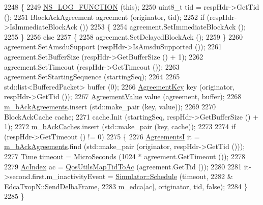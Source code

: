 \begin{DoxyCode}
2248 \{
2249   \hyperlink{log-macros-disabled_8h_a90b90d5bad1f39cb1b64923ea94c0761}{NS\_LOG\_FUNCTION} (\textcolor{keyword}{this});
2250   uint8\_t tid = respHdr->GetTid ();
2251   BlockAckAgreement agreement (originator, tid);
2252   \textcolor{keywordflow}{if} (respHdr->IsImmediateBlockAck ())
2253     \{
2254       agreement.SetImmediateBlockAck ();
2255     \}
2256   \textcolor{keywordflow}{else}
2257     \{
2258       agreement.SetDelayedBlockAck ();
2259     \}
2260   agreement.SetAmsduSupport (respHdr->IsAmsduSupported ());
2261   agreement.SetBufferSize (respHdr->GetBufferSize () + 1);
2262   agreement.SetTimeout (respHdr->GetTimeout ());
2263   agreement.SetStartingSequence (startingSeq);
2264 
2265   std::list<BufferedPacket> buffer (0);
2266   \hyperlink{classns3_1_1MacLow_a8d666357756bbc5ea2d1b7fac3a5e938}{AgreementKey} key (originator, respHdr->GetTid ());
2267   \hyperlink{classns3_1_1MacLow_a68fcd01fab733ead22d9655640258a6a}{AgreementValue} value (agreement, buffer);
2268   \hyperlink{classns3_1_1MacLow_a53482df1a7e6f136cfa8ce50fa10adc2}{m\_bAckAgreements}.insert (std::make\_pair (key, value));
2269 
2270   BlockAckCache cache;
2271   cache.Init (startingSeq, respHdr->GetBufferSize () + 1);
2272   \hyperlink{classns3_1_1MacLow_a1a2b5d95cae95e9b99e6508d7d350b47}{m\_bAckCaches}.insert (std::make\_pair (key, cache));
2273 
2274   \textcolor{keywordflow}{if} (respHdr->GetTimeout () != 0)
2275     \{
2276       \hyperlink{classns3_1_1MacLow_a7876cc9b328cdb0508f2a7b7647eab10}{AgreementsI} it = \hyperlink{classns3_1_1MacLow_a53482df1a7e6f136cfa8ce50fa10adc2}{m\_bAckAgreements}.find (std::make\_pair (originator, 
      respHdr->GetTid ()));
2277       \hyperlink{namespacens3_1_1TracedValueCallback_a7ffd3e7c142ffe7c8a1d2db9b8de38ec}{Time} \hyperlink{openflow-switch_8cc_a386d174ae121d1cfa279074b7e209714}{timeout} = \hyperlink{group__timecivil_ga17465a639c8d1464e76538afdd78a9f0}{MicroSeconds} (1024 * agreement.GetTimeout ());
2278 
2279       \hyperlink{group__wifi_gab422b4562ba272b39a9b6bca3513f3ac}{AcIndex} ac = \hyperlink{group__wifi_ga4e36efcff6dd83eaee42e1af0de43d48}{QosUtilsMapTidToAc} (agreement.GetTid ());
2280 
2281       it->second.first.m\_inactivityEvent = \hyperlink{classns3_1_1Simulator_a671882c894a08af4a5e91181bf1eec13}{Simulator::Schedule} (timeout,
2282                                                                 &
      \hyperlink{classns3_1_1EdcaTxopN_a3a14d846328f0d5447f44d7c2f3c607e}{EdcaTxopN::SendDelbaFrame},
2283                                                                 \hyperlink{classns3_1_1MacLow_a754751ba4152c9337611a5f015045a44}{m\_edca}[ac], originator, tid, \textcolor{keyword}{false});
2284     \}
2285 \}
\end{DoxyCode}


